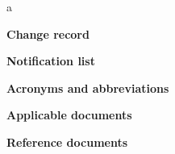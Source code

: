\small
\cvsID
\normalsize

\pagebreak
a
\vspace{2cm}
\begin{center}
\Large
{\bf Change record\\ \vspace{1cm}}
\normalsize
\daspchangerecord
\end{center}
\vspace{2cm}

\begin{center}
\Large
{\bf Notification list\\ \vspace{1cm}}
\normalsize
\daspnotificationlist
\end{center}

\pagebreak

\begin{center}
\Large
{\bf Acronyms and abbreviations\\ \vspace{1cm}}
\normalsize
\daspabbreviations
\end{center}

\pagebreak

\begin{center}
\Large
{\bf Applicable documents\\ \vspace{1cm}}
\normalsize

\daspapplicabledocs
\end{center}
\vspace{2cm}

\begin{center}
\Large
{\bf Reference documents \\ \vspace{1cm}}
\normalsize

\dasprefdocs
\end{center}

\pagebreak
\tableofcontents
\pagebreak
